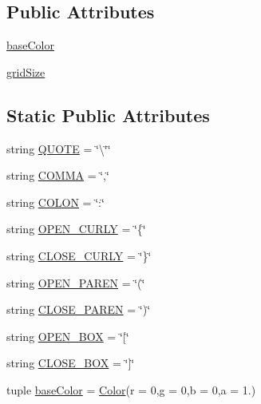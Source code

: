 \subsection*{Public Attributes}
\begin{DoxyCompactItemize}
\item 
\hyperlink{class_bridges_1_1_color_grid_1_1_color_grid_a1ea984f1d35cc7c0da84bfb5c8b17ade}{base\+Color}
\item 
\hyperlink{class_bridges_1_1_color_grid_1_1_color_grid_acdd1af0874b83b5b77c75ff6747102cc}{grid\+Size}
\end{DoxyCompactItemize}
\subsection*{Static Public Attributes}
\begin{DoxyCompactItemize}
\item 
string \hyperlink{class_bridges_1_1_color_grid_1_1_color_grid_a002fefeb0638ed945322a41c386a5a77}{Q\+U\+O\+T\+E} = \char`\"{}\textbackslash{}\char`\"{}\char`\"{}
\item 
string \hyperlink{class_bridges_1_1_color_grid_1_1_color_grid_acf1127c478d1982039ba2a40ae4cca77}{C\+O\+M\+M\+A} = \char`\"{},\char`\"{}
\item 
string \hyperlink{class_bridges_1_1_color_grid_1_1_color_grid_a58499f4301d3108ce3347832d5500879}{C\+O\+L\+O\+N} = \char`\"{}\+:\char`\"{}
\item 
string \hyperlink{class_bridges_1_1_color_grid_1_1_color_grid_a90f35bbd4c3d1fe9a4968592c11a1656}{O\+P\+E\+N\+\_\+\+C\+U\+R\+L\+Y} = \char`\"{}\{\char`\"{}
\item 
string \hyperlink{class_bridges_1_1_color_grid_1_1_color_grid_ae2e480f319d0f7836737f319965a5f2d}{C\+L\+O\+S\+E\+\_\+\+C\+U\+R\+L\+Y} = \char`\"{}\}\char`\"{}
\item 
string \hyperlink{class_bridges_1_1_color_grid_1_1_color_grid_a9987810ba393470f5a995736e74d22bc}{O\+P\+E\+N\+\_\+\+P\+A\+R\+E\+N} = \char`\"{}(\char`\"{}
\item 
string \hyperlink{class_bridges_1_1_color_grid_1_1_color_grid_a68f4bd26cd46559b44cd735396e6c132}{C\+L\+O\+S\+E\+\_\+\+P\+A\+R\+E\+N} = \char`\"{})\char`\"{}
\item 
string \hyperlink{class_bridges_1_1_color_grid_1_1_color_grid_a46229b36208156dfe062b41804cf1416}{O\+P\+E\+N\+\_\+\+B\+O\+X} = \char`\"{}\mbox{[}\char`\"{}
\item 
string \hyperlink{class_bridges_1_1_color_grid_1_1_color_grid_ad521dc693bd68060060adb3cbee2d5c1}{C\+L\+O\+S\+E\+\_\+\+B\+O\+X} = \char`\"{}\mbox{]}\char`\"{}
\item 
tuple \hyperlink{class_bridges_1_1_color_grid_1_1_color_grid_a25b427d04035edbc243d78f021cfae44}{base\+Color} = \hyperlink{class_bridges_1_1_color_1_1_color}{Color}(r = 0,g = 0,b = 0,a = 1.)
\end{DoxyCompactItemize}


